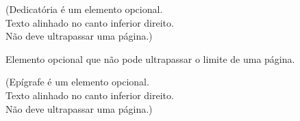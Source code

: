 \documentclass[
	12pt,				%
	openright,			%
	oneside,			%
	a4paper,			%
	english,			%
	french,				%
	spanish,			%
	brazil				%
	]{abntex2}
\begin{document}
\frenchspacing 



\imprimircapa
\imprimirfolhaderosto* %

%




%


\begin{dedicatoria}
    \vspace*{\fill}
	\begin{flushright}
    		(Dedicatória é um elemento opcional.\\ 
            Texto alinhado no canto inferior direito.\\
            Não deve ultrapassar uma página.)
	\end{flushright}
\end{dedicatoria}




\begin{agradecimentos}
    Elemento opcional que não pode ultrapassar o limite de uma página.
\end{agradecimentos}

\begin{epigrafe}
    \vspace*{\fill}
	\begin{flushright}
    		(Epígrafe é um elemento opcional.\\
    		Texto alinhado no canto inferior direito.\\
            Não deve ultrapassar uma página.)
	\end{flushright}
\end{epigrafe}
\end{document}
